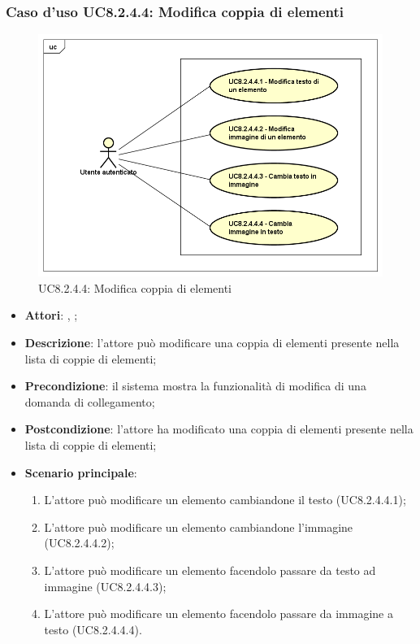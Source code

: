 	\subsubsection{Caso d'uso UC8.2.4.4: Modifica coppia di elementi}
	\label{UC8.2.4.4}
	\begin{figure}[h]
		\centering
		\includegraphics[scale=0.5,keepaspectratio]{UML/UC8_2_4_4.png}
		\caption{UC8.2.4.4: Modifica coppia di elementi}
	\end{figure}
	\FloatBarrier
	\begin{itemize}
		\item \textbf{Attori}: \uau, \uaupro;
		\item \textbf{Descrizione}: l'attore può modificare una coppia di elementi presente nella lista di coppie di elementi;
		\item \textbf{Precondizione}: il sistema mostra la funzionalità di modifica di una domanda di collegamento; 
		\item \textbf{Postcondizione}: l'attore ha modificato una coppia di elementi presente nella lista di coppie di elementi; 
		\item \textbf{Scenario principale}: 
		\begin{enumerate}
			\item L'attore può modificare un elemento cambiandone il testo (UC8.2.4.4.1);
			\item L'attore può modificare un elemento cambiandone l'immagine (UC8.2.4.4.2);
			\item L'attore può modificare un elemento facendolo passare da testo ad immagine (UC8.2.4.4.3);
			\item L'attore può modificare un elemento facendolo passare da immagine a testo (UC8.2.4.4.4).	
		\end{enumerate}
	\end{itemize}
	

